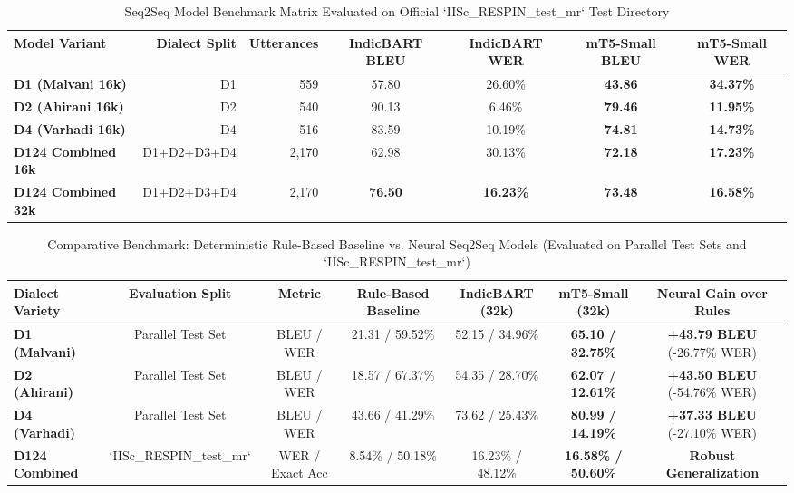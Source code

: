\documentclass[journal,twocolumn]{IEEEtran}
\begin{document}
\begin{table}[t]
\caption{Seq2Seq Model Benchmark Matrix Evaluated on Official `IISc\_RESPIN\_test\_mr` Test Directory}
\label{tab:results_respin}
\centering
\begin{tabularx}{\textwidth}{l r r c c c c}
\toprule
\textbf{Model Variant} & \textbf{Dialect Split} & \textbf{Utterances} & \textbf{IndicBART BLEU} & \textbf{IndicBART WER} & \textbf{mT5-Small BLEU} & \textbf{mT5-Small WER} \\
\midrule
\textbf{D1 (Malvani 16k)} & D1 & 559 & 57.80 & 26.60\% & \textbf{43.86} & \textbf{34.37\%} \\
\textbf{D2 (Ahirani 16k)} & D2 & 540 & 90.13 & 6.46\% & \textbf{79.46} & \textbf{11.95\%} \\
\textbf{D4 (Varhadi 16k)} & D4 & 516 & 83.59 & 10.19\% & \textbf{74.81} & \textbf{14.73\%} \\
\midrule
\textbf{D124 Combined 16k} & D1+D2+D3+D4 & 2,170 & 62.98 & 30.13\% & \textbf{72.18} & \textbf{17.23\%} \\
\textbf{D124 Combined 32k} & D1+D2+D3+D4 & 2,170 & \textbf{76.50} & \textbf{16.23\%} & \textbf{73.48} & \textbf{16.58\%} \\
\bottomrule
\end{tabularx}
\end{table}

\begin{table}[t]
\caption{Comparative Benchmark: Deterministic Rule-Based Baseline vs. Neural Seq2Seq Models (Evaluated on Parallel Test Sets and `IISc\_RESPIN\_test\_mr`)}
\label{tab:results_rule_vs_neural}
\centering
\begin{tabularx}{\textwidth}{l c c c c c c}
\toprule
\textbf{Dialect Variety} & \textbf{Evaluation Split} & \textbf{Metric} & \textbf{Rule-Based Baseline} & \textbf{IndicBART (32k)} & \textbf{mT5-Small (32k)} & \textbf{Neural Gain over Rules} \\
\midrule
\textbf{D1 (Malvani)} & Parallel Test Set & BLEU / WER & 21.31 / 59.52\% & 52.15 / 34.96\% & \textbf{65.10 / 32.75\%} & \textbf{+43.79 BLEU} (-26.77\% WER) \\
\textbf{D2 (Ahirani)} & Parallel Test Set & BLEU / WER & 18.57 / 67.37\% & 54.35 / 28.70\% & \textbf{62.07 / 12.61\%} & \textbf{+43.50 BLEU} (-54.76\% WER) \\
\textbf{D4 (Varhadi)} & Parallel Test Set & BLEU / WER & 43.66 / 41.29\% & 73.62 / 25.43\% & \textbf{80.99 / 14.19\%} & \textbf{+37.33 BLEU} (-27.10\% WER) \\
\midrule
\textbf{D124 Combined} & `IISc\_RESPIN\_test\_mr` & WER / Exact Acc & 8.54\% / 50.18\% & 16.23\% / 48.12\% & \textbf{16.58\% / 50.60\%} & \textbf{Robust Generalization} \\
\bottomrule
\end{tabularx}
\end{table}
\end{document}
